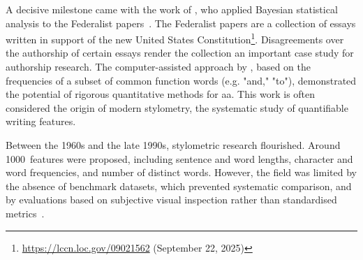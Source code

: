 

A decisive milestone came with the work of \citet{mosteller_1964}, who applied Bayesian statistical analysis to the Federalist papers~\citep{hamilton_federalist_1787}.
The Federalist papers are a collection of essays written in support of the new United States Constitution\footnote{\url{https://lccn.loc.gov/09021562} (September 22, 2025)}.
Disagreements over the authorship of certain essays render the collection an important case study for authorship research.
The computer-assisted approach by \citet{mosteller_1964}, based on the frequencies of a subset of common function words (e.g. "and," "to"), demonstrated the potential of rigorous quantitative methods for \ac{aa}. 
This work is often considered the origin of modern stylometry, the systematic study of quantifiable writing features.

Between the 1960s and the late 1990s, stylometric research flourished.
Around \num{1000}~features were proposed, including sentence and word lengths, character and word frequencies, and number of distinct words. 
However, the field was limited by the absence of benchmark datasets, which prevented systematic comparison, and by evaluations based on subjective visual inspection rather than standardised metrics~\citep{stamatatos_survey_2009}.

